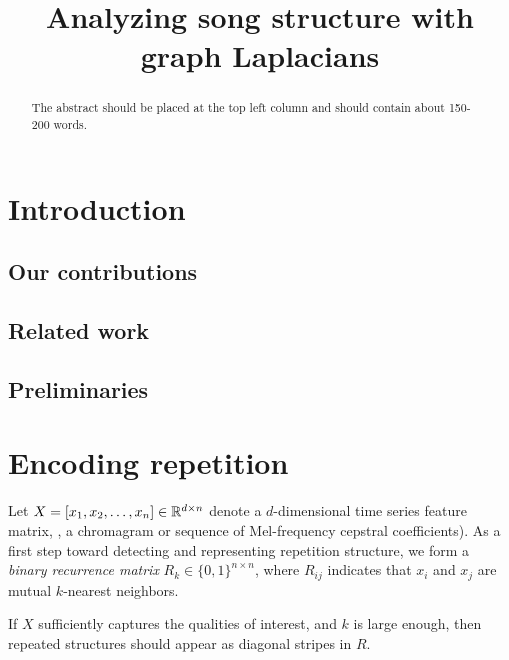 \documentclass{article}
\title{Analyzing song structure with graph Laplacians}
\begin{document}
%
\maketitle
%
\begin{abstract}
The abstract should be placed at the top left column and should contain about 150-200 words.
\end{abstract}
%
\section{Introduction}\label{sec:introduction}

\subsection{Our contributions}

\subsection{Related work}

\cite{serra2012unsupervised}

\cite{grohganz2013converting}

\subsection{Preliminaries}
\section{Encoding repetition}

Let $X = [x_1, x_2, \dots, x_n] \in \mathbb{R}^{d\times n}$ denote a $d$-dimensional time
series feature matrix, \eg, a chromagram or sequence of Mel-frequency cepstral 
coefficients).  As a first step toward detecting and representing repetition structure, 
we form a \emph{binary recurrence matrix} $R_k \in \{0,1\}^{n\times n}$, where $R_{ij}$ 
indicates that $x_i$ and $x_j$ are mutual $k$-nearest neighbors.

If $X$ sufficiently captures the qualities of interest, and $k$ is large
enough, then repeated structures should appear as diagonal stripes in $R$.
\end{document}
